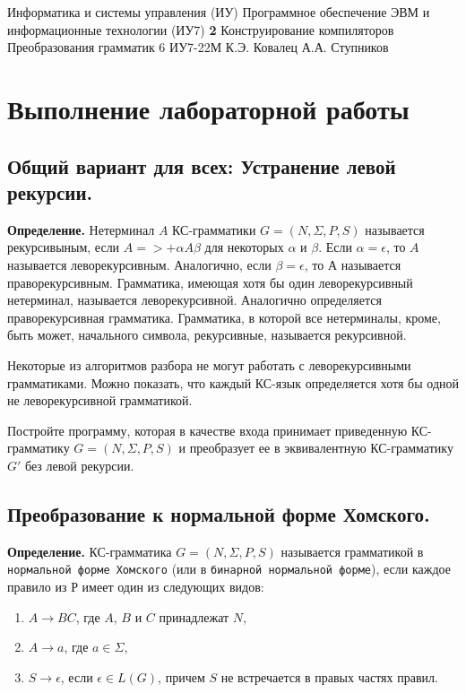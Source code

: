 \documentclass{bmstu}
\begin{document}
\makereporttitle
{Информатика и системы управления (ИУ)}
{Программное обеспечение ЭВМ и информационные технологии (ИУ7)}
{\textbf{2}}
{Конструирование компиляторов}
{Преобразования грамматик}
{6}
{ИУ7-22М}
{К.Э. Ковалец}
{А.А. Ступников}


\setcounter{page}{2}


\chapter{Выполнение лабораторной работы}

\section{Общий вариант для всех: Устранение левой рекурсии.}

\textbf{Определение.} Нетерминал $A$ КС-грамматики $G = (N, \Sigma, P, S)$ называется рекурсивыным, если $A =>+ \alpha A \beta$ для некоторых $\alpha$ и $\beta$. Если $\alpha = \epsilon$, то $A$ называется леворекурсивным. Аналогично, если $\beta = \epsilon$, то $А$ называется праворекурсивным. Грамматика, имеющая хотя бы один леворекурсивный нетерминал, называется леворекурсивной. Аналогично определяется праворекурсивная грамматика. Грамматика, в которой все нетерминалы, кроме, быть может, начального символа, рекурсивные, называется рекурсивной.

Некоторые из алгоритмов разбора не могут работать с леворекурсивными грамматиками. Можно показать, что каждый КС-язык определяется хотя бы одной не леворекурсивной грамматикой.

Постройте программу, которая в качестве входа принимает приведенную КС-грамматику $G = (N, \Sigma, P, S)$ и преобразует ее в эквивалентную КС-грамматику $G'$ без левой рекурсии.

\section{Преобразование к нормальной форме Хомского.}

\textbf{Определение.} КС-грамматика $G = (N, \Sigma, P, S)$ называется грамматикой в \texttt{нормальной форме Хомского} (или в \texttt{бинарной нормальной форме}), если каждое правило из $Р$ имеет один из следующих видов:
\begin{enumerate}
    \item $A \rightarrow BC$, где $A$, $B$ и $C$ принадлежат $N$,
    \item $A \rightarrow a$, где $a \in \Sigma$,
    \item $S \rightarrow \epsilon$, если $\epsilon \in L(G)$, причем $S$ не встречается в правых частях правил.
\end{enumerate}
\end{document}

